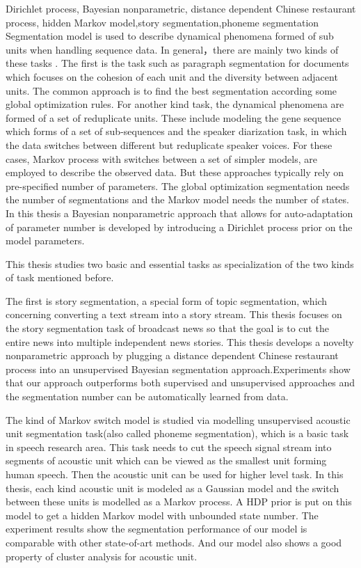 \begin{spacing}{1.2}
\begin{abstractEng}{Dirichlet process, Bayesian nonparametric, distance dependent Chinese restaurant process, hidden Markov model,story segmentation,phoneme segmentation}
Segmentation model is used to describe dynamical phenomena formed of sub units when handling sequence data. In general，there are mainly two kinds of these tasks
. The first is the task such as paragraph segmentation for documents which focuses on the cohesion of each unit and the diversity between adjacent units. The common approach is to find the best segmentation according some global optimization rules. For another kind task, the dynamical phenomena are formed of a set of reduplicate units. These include modeling the gene sequence which forms of a set of sub-sequences and the speaker diarization task, in which the data switches between different but reduplicate speaker voices. For these cases, Markov process with switches between a set of simpler models, are employed to describe the observed data. But these approaches typically rely on pre-specified number of parameters. The global optimization segmentation needs the number of segmentations and the Markov model needs the number of states. In this thesis a Bayesian nonparametric approach that allows for auto-adaptation of parameter number is developed by introducing a Dirichlet process prior on the model parameters. 

This thesis studies two basic and essential tasks as specialization of the two kinds of task mentioned before. 

The first is story segmentation, a special form of topic segmentation, which concerning converting a text stream into a story stream. This thesis focuses on the story segmentation task of broadcast news so that the goal is to cut the entire news into multiple independent news stories. This thesis develops a novelty nonparametric approach by plugging a distance dependent Chinese restaurant process into an unsupervised Bayesian segmentation approach.Experiments show that our approach outperforms both supervised and unsupervised approaches and the segmentation number can be automatically learned from data. 

The kind of Markov switch model is studied via modelling unsupervised acoustic unit segmentation task(also called phoneme segmentation), which is a basic task in speech research area. This task needs to cut the speech signal stream into segments of acoustic unit which can be viewed as the smallest unit forming human speech. Then the acoustic unit can be used for higher level task. In this thesis, each kind acoustic unit is modeled as a Gaussian model and the switch between these units is modelled as a Markov process.  A HDP prior is put on this model to get a hidden Markov model with unbounded state number. The experiment results show the segmentation performance of our model is comparable with other state-of-art methods. And our model also shows a good property of cluster analysis for acoustic unit.

\end{abstractEng}
\cleardoublepage
\end{spacing}
\tableofcontents
\mainmatter